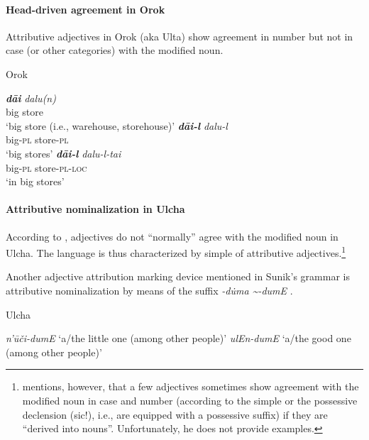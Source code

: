 \paragraph*{Head\hyp{}driven agreement in Orok}
Attributive adjectives in Orok (aka Ulta) show agreement in number but not in case (or other categories) with the modified noun.
\begin{exe}
\ex 
{\rm Orok \citep[55]{petrova1967}}
\begin{xlist}
\ex
\gll \textit{\textbf{dāi}} \textit{dalu(n)}\\
	big store\\
\glt ‘big store (i.e., warehouse, storehouse)’
\ex 
\gll	\textit{\textbf{dāi-l}} \textit{dalu-l}\\
	big-\textsc{pl} store-\textsc{pl}\\
\glt	‘big stores’
\ex 
\gll	\textit{\textbf{dāi-l}} \textit{dalu-l-tai}\\
	big-\textsc{pl} store-\textsc{pl}-\textsc{loc}\\
\glt	‘in big stores’
\end{xlist}
\end{exe}

\paragraph*{Attributive nominalization in Ulcha}
According to \citet[36, 52–53]{sunik1985}, adjectives do not “normally” agree with the modified noun in Ulcha. The language is thus characterized by simple  of attributive adjectives.\footnote{\citet[36]{sunik1985} mentions, however, that a few adjectives sometimes show agreement with the modified noun in case and number (according to the simple or the possessive declension (sic!), i.e., are equipped with a possessive suffix) if they are “derived into nouns”. Unfortunately, he does not provide examples.}

Another adjective attribution marking device mentioned in Sunik's grammar is attributive nominalization by means of the suffix \textit{-d\.uma \textasciitilde-dumE} \citep{sunik1985}.
\begin{exe}
\ex 
{\rm Ulcha \citep[38]{sunik1985}}
\begin{xlist}
\ex \textit{n'ūči-dumE} {\rm ‘a/the little one (among other people)’}
\ex \textit{ulEn-dumE} {\rm ‘a/the good one (among other people)’}
\end{xlist}
\end{exe}

